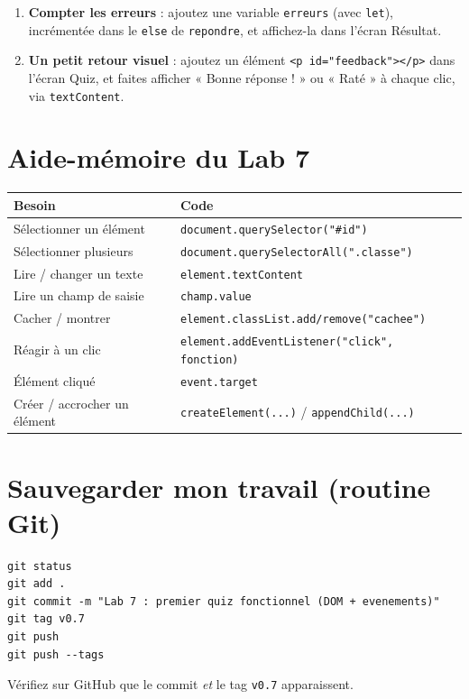 \documentclass[11pt,a4paper]{article}
\newcommand{\code}[1]{\texttt{#1}}
\begin{document}
\begin{objectifbox}
\begin{enumerate}[leftmargin=*]
  \item \textbf{Compter les erreurs} : ajoutez une variable \code{erreurs} (avec \code{let}), incrémentée dans le \code{else} de \code{repondre}, et affichez-la dans l'écran Résultat.
  \item \textbf{Un petit retour visuel} : ajoutez un élément \code{<p id="feedback"></p>} dans l'écran Quiz, et faites afficher « Bonne réponse ! » ou « Raté » à chaque clic, via \code{textContent}.
\end{enumerate}
\end{objectifbox}

\section{Aide-mémoire du Lab 7}

\begin{center}
\begin{tabular}{p{5.4cm} p{7.6cm}}
\toprule
\textbf{Besoin} & \textbf{Code} \\
\midrule
Sélectionner un élément & \code{document.querySelector("\#id")} \\
Sélectionner plusieurs & \code{document.querySelectorAll(".classe")} \\
Lire / changer un texte & \code{element.textContent} \\
Lire un champ de saisie & \code{champ.value} \\
Cacher / montrer & \code{element.classList.add/remove("cachee")} \\
Réagir à un clic & \code{element.addEventListener("click", fonction)} \\
Élément cliqué & \code{event.target} \\
Créer / accrocher un élément & \code{createElement(...)} \quad / \quad \code{appendChild(...)} \\
\bottomrule
\end{tabular}
\end{center}

\section{Sauvegarder mon travail (routine Git)}

\begin{retenirbox}
\begin{lstlisting}[style=html]
git status
git add .
git commit -m "Lab 7 : premier quiz fonctionnel (DOM + evenements)"
git tag v0.7
git push
git push --tags
\end{lstlisting}
Vérifiez sur GitHub que le commit \emph{et} le tag \code{v0.7} apparaissent.
\end{retenirbox}
\end{document}
